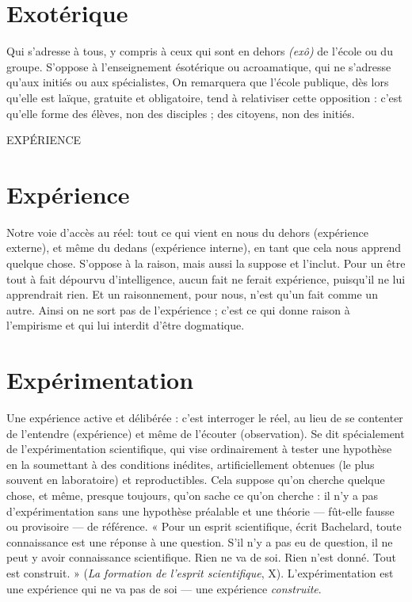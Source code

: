\section{Exotérique}
Qui s'adresse à tous, y compris à ceux qui sont en dehors
{\it (exô)} de l’école ou du groupe. S’oppose à l’enseignement
ésotérique ou acroamatique, qui ne s'adresse qu’aux initiés ou aux spécialistes,
On remarquera que l’école publique, dès lors qu’elle est laïque, gratuite et obligatoire,
tend à relativiser cette opposition : c’est qu’elle forme des élèves, non
des disciples ; des citoyens, non des initiés.

EXPÉRIENCE
\section{Expérience}
Notre voie d’accès au réel: tout ce qui vient en nous du
dehors (expérience externe), et même du dedans (expérience
interne), en tant que cela nous apprend quelque chose. S’oppose à la raison,
mais aussi la suppose et l’inclut. Pour un être tout à fait dépourvu d’intelligence,
aucun fait ne ferait expérience, puisqu'il ne lui apprendrait rien. Et un
raisonnement, pour nous, n’est qu’un fait comme un autre. Ainsi on ne sort
pas de l'expérience ; c’est ce qui donne raison à l’empirisme et qui lui interdit
d’être dogmatique.

\section{Expérimentation}
Une expérience active et délibérée : c’est interroger
le réel, au lieu de se contenter de l'entendre (expérience)
et même de l’écouter (observation). Se dit spécialement de l’expérimentation
scientifique, qui vise ordinairement à tester une hypothèse en la soumettant
à des conditions inédites, artificiellement obtenues (le plus souvent en
laboratoire) et reproductibles. Cela suppose qu’on cherche quelque chose, et
même, presque toujours, qu’on sache ce qu’on cherche : il n’y a pas d’expérimentation
sans une hypothèse préalable et une théorie — fût-elle fausse ou provisoire —
de référence. « Pour un esprit scientifique, écrit Bachelard, toute
connaissance est une réponse à une question. S’il n’y a pas eu de question, il ne
peut y avoir connaissance scientifique. Rien ne va de soi. Rien n’est donné.
Tout est construit. » ({\it La formation de l'esprit scientifique}, X). L’expérimentation
est une expérience qui ne va pas de soi — une expérience {\it construite}.

